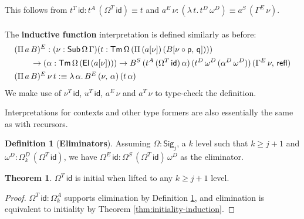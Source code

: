 \documentclass[12pt,a4paper,twoside,openany]{book}
\theoremstyle{remark}
\theoremstyle{definition}
\newtheorem{mydefinition}{Definition}
\theoremstyle{theorem}
\newtheorem{theorem}{Theorem}
\newcommand{\refl}{\mathsf{refl}}
\newcommand{\id}{\mathsf{id}}
\newcommand{\Sub}{\mathsf{Sub}}
\newcommand{\Tm}{\mathsf{Tm}}
\newcommand{\El}{\mathsf{El}}
\newcommand{\Sig}{\mathsf{Sig}}
\newcommand{\p}{\mathsf{p}}
\newcommand{\q}{\mathsf{q}}
\newcommand{\defn}{:\equiv}
\begin{document}
This follows from $t^T\,\id : t^A\,(\Omega^T\,\id) \equiv t$ and $a^E\,\nu : (\lambda\,t.\,t^D\,\omega^D) \equiv a^S\,(\Gamma^E\,\nu)$.
\\\\
\noindent The \textbf{inductive function} interpretation is defined similarly as before:
\begin{alignat*}{3}
 &(\Pi\,a\,B)^E : (\nu : \Sub\,\Omega\,\Gamma)(t : \Tm\,\Omega\,(\Pi\,(a[\nu])\,(B[\nu\circ\p,\,\q])))\\
 & \hspace{2em}\to (\alpha : \Tm\,\Omega\,(\El\,(a[\nu]))) \to B^S\,(t^A\,(\Omega^T\,\id)\,\alpha)\,(t^D\,\omega^D\,(\alpha^D\,\omega^D))\,(\Gamma^E\,\nu,\,\refl)\\
 &\rlap{$(\Pi\,a\,B)^E\,\nu\,t \defn \lambda\,\alpha.\,B^E\,(\nu,\,\alpha)\,(t\,\alpha)$}
\end{alignat*}
We make use of $\nu^T\,\id$, $u^T\,\id$, $a^E\,\nu$ and $a^T\,\nu$ to type-check the definition.

Interpretations for contexts and other type formers are also essentially the same as with recursors.

\begin{mydefinition}[\textbf{Eliminators}]
\label{def:fqiit-eliminator}
Assuming $\Omega : \Sig_j$, a $k$ level such that $k \geq j + 1$ and $\omega^D :
\Omega^D_{k}\,(\Omega^T\,\id)$, we have $\Omega^E\,\id : \Omega^S\,(\Omega^T\,\id)\,\omega^D$ as
the eliminator.
\end{mydefinition}

\begin{theorem}
  $\Omega^T\,\id$ is initial when lifted to any $k \geq j + 1$ level.
\end{theorem}
\begin{proof}
  $\Omega^T\,\id : \Omega^A_{k}$ supports elimination by Definition \ref{def:fqiit-eliminator},
  and elimination is equivalent to initiality by Theorem \ref{thm:initiality-induction}.
\end{proof}

\end{document}
